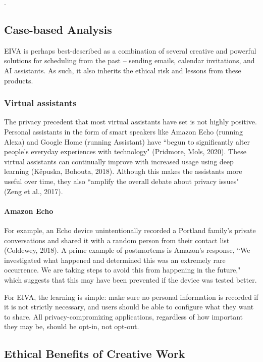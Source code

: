 \documentclass{article}
\begin{document}
.

\subsection{Case-based Analysis}

EIVA is perhaps best-described as a combination of several creative and powerful solutions for scheduling from the past -- sending emails, calendar invitations, and AI assistants. As such, it also inherits the ethical risk and lessons from these products.

\subsubsection{Virtual assistants}

The privacy precedent that most virtual assistants have set is not highly positive. Personal assistants in the form of smart speakers like Amazon Echo (running Alexa) and Google Home (running Assistant) have ``begun to significantly alter people’s everyday experiences with technology" (Pridmore, Mols, 2020). These virtual assistants can continually improve with increased usage using deep learning (Këpuska, Bohouta, 2018). Although this makes the assistants more useful over time, they also ``amplify the overall debate about privacy issues" (Zeng et al., 2017).

\paragraph{Amazon Echo}

For example, an Echo device unintentionally recorded a Portland family's private conversations and shared it with a random person from their contact list (Coldewey, 2018). A prime example of postmortems is Amazon's response, ``We investigated what happened and determined this was an extremely rare occurrence. We are taking steps to avoid this from happening in the future," which suggests that this may have been prevented if the device was tested better.

For EIVA, the learning is simple: make sure no personal information is recorded if it is not strictly necessary, and users should be able to configure what they want to share. All privacy-compromizing applications, regardless of how important they may be, should be opt-in, not opt-out.

\subsection{Ethical Benefits of Creative Work}
\end{document}
